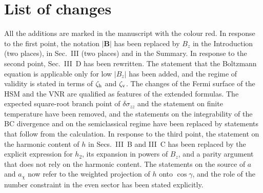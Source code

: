 \documentclass[aps,prb,onecolumn,nofootinbib,citeautoscript,10pt]{revtex4-2}
\DeclareRobustCommand{\bs}[1]{\bm{#1}}
\begin{document}
\begin{enumerate}
\end{enumerate}

\section{List of changes}

All the additions are marked in the manuscript with the colour red. In response to the first point, the notation $|\bs B|$ has been replaced by $B_z$ in the Introduction (two places), in Sec.~III (two places) and in the Summary. In response to the second point, Sec.~III~D has been rewritten. The statement that the Boltzmann equation is applicable only for low $|B_z|$ has been added, and the regime of validity is stated in terms of $\zeta_{\rm h}$ and $\zeta_{\rm v}$. The changes of the Fermi surface of the HSM and the VNR are qualified as features of the extended formulas. The expected square-root branch point of $\delta\sigma_{zz}$ and the statement on finite temperature have been removed, and the statements on the integrability of the BC divergence and on the semiclassical regime have been replaced by statements that follow from the calculation. In response to the third point, the statement on the harmonic content of $h$ in Secs.~III~B and III~C has been replaced by the explicit expression for $h_2$, its expansion in powers of $B_z$, and a parity argument that does not rely on the harmonic content. The statements on the source of $a$ and $a_\chi$ now refer to the weighted projection of $h$ onto $\cos\gamma$, and the role of the number constraint in the even sector has been stated explicitly.
\end{document}
